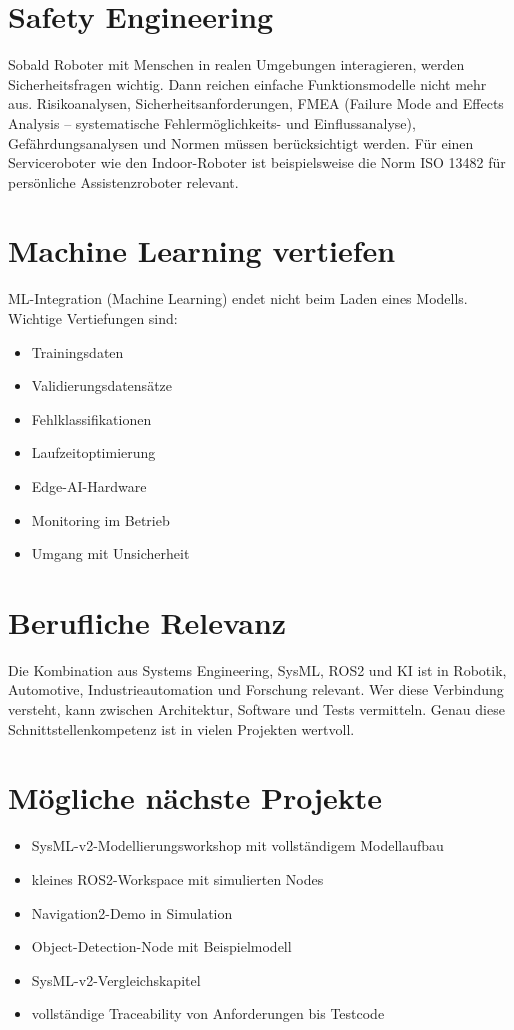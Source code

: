 \section{Safety Engineering}
Sobald Roboter mit Menschen in realen Umgebungen interagieren, werden Sicherheitsfragen wichtig. Dann reichen einfache Funktionsmodelle nicht mehr aus. Risikoanalysen, Sicherheitsanforderungen, FMEA (Failure Mode and Effects Analysis – systematische Fehlermöglichkeits- und Einflussanalyse), Gefährdungsanalysen und Normen müssen berücksichtigt werden. Für einen Serviceroboter wie den Indoor-Roboter ist beispielsweise die Norm ISO 13482 für persönliche Assistenzroboter relevant.

\section{Machine Learning vertiefen}
ML-Integration (Machine Learning) endet nicht beim Laden eines Modells. Wichtige Vertiefungen sind:

\begin{itemize}
    \item Trainingsdaten
    \item Validierungsdatensätze
    \item Fehlklassifikationen
    \item Laufzeitoptimierung
    \item Edge-AI-Hardware
    \item Monitoring im Betrieb
    \item Umgang mit Unsicherheit
\end{itemize}

\section{Berufliche Relevanz}
Die Kombination aus Systems Engineering, SysML, ROS2 und KI ist in Robotik, Automotive, Industrieautomation und Forschung relevant. Wer diese Verbindung versteht, kann zwischen Architektur, Software und Tests vermitteln. Genau diese Schnittstellenkompetenz ist in vielen Projekten wertvoll.

\section{Mögliche nächste Projekte}
\begin{itemize}
    \item SysML-v2-Modellierungsworkshop mit vollständigem Modellaufbau
    \item kleines ROS2-Workspace mit simulierten Nodes
    \item Navigation2-Demo in Simulation
    \item Object-Detection-Node mit Beispielmodell
    \item SysML-v2-Vergleichskapitel
    \item vollständige Traceability von Anforderungen bis Testcode
\end{itemize}

